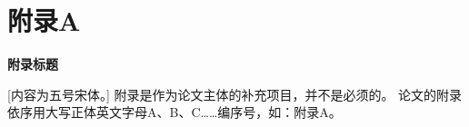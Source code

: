 

\chapter{附录A}

\begin{center}
\textbf{附录标题}
\end{center}



\indent
{}
[内容为五号宋体。] 附录是作为论文主体的补充项目，并不是必须的。
论文的附录依序用大写正体英文字母A、B、C……编序号，如：附录A。